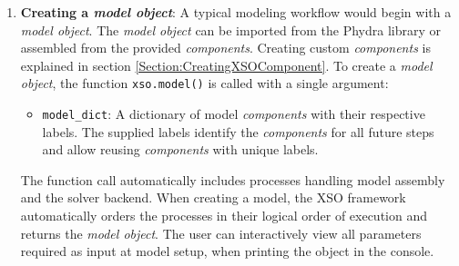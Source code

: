 \documentclass[journal abbreviation, manuscript]{copernicus}
\begin{document}
\begin{enumerate}
    \item \textbf{Creating a \textit{model object}}: 
    A typical modeling workflow would begin with a \textit{model object}. The \textit{model object} can be imported from the Phydra library or assembled from the provided \textit{components}. Creating custom \textit{components} is explained in section \ref{Section:CreatingXSOComponent}.
    To create a \textit{model object}, the function \texttt{xso.model()} is called with a single argument:
    \begin{itemize}
        \item \texttt{model\_dict}: A dictionary of model \textit{components} with their respective labels. The supplied labels identify the \textit{components} for all future steps and allow reusing \textit{components} with unique labels.
    \end{itemize}
    The function call automatically includes processes handling model assembly and the solver backend. When creating a model, the XSO framework automatically orders the processes in their logical order of execution and returns the \textit{model object}. The user can interactively view all parameters required as input at model setup, when printing the object in the console.


\end{enumerate}
\end{document}
